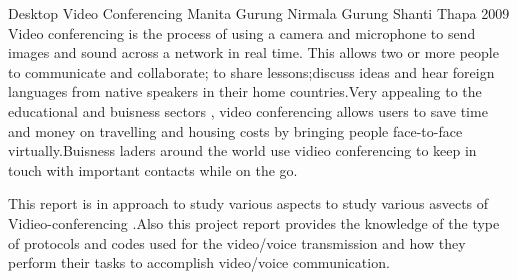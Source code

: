  \begin{conf-abstract}[]
{Desktop Video Conferencing}
{
Manita Gurung
Nirmala Gurung 
Shanti Thapa
}
{2009}
Video conferencing is the process of using a camera and microphone to send images and sound across a network in real time. This allows two or more people to communicate and collaborate; to share lessons;discuss ideas and hear foreign languages from native speakers in their home countries.Very appealing to the educational and buisness sectors , video conferencing allows users to save time and money on travelling and housing costs by bringing people face-to-face virtually.Buisness laders around the world use vidieo conferencing to keep in touch with important contacts while on the go.

This report is in approach to study various aspects to study various asvects of Vidieo-conferencing .Also this project report provides the knowledge of the type of protocols and codes used for the video/voice transmission and how they perform their tasks to accomplish video/voice communication.
  \end{conf-abstract}